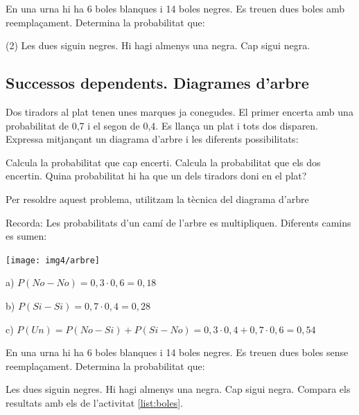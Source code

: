 \begin{mylist}
 \exer[1] \label{list:boles} En una urna hi ha 6 boles blanques i 14 boles negres. Es treuen dues boles amb reemplaçament. Determina la probabilitat que: 
\begin{tasks}(2)
	\task  Les dues siguin negres.  
	\task  Hi hagi almenys una negra.  
	\task  Cap sigui negra.
\end{tasks}

\subsection{Successos dependents. Diagrames d'arbre}

\begin{resolt}[E]{
	 Dos tiradors al plat tenen unes marques ja conegudes. El primer encerta amb una probabilitat de 0,7 i el segon de 0,4. Es llança un plat i tots dos disparen. Expressa mitjançant un diagrama d'arbre i les diferents possibilitats: 
	 \vspace{0.5cm}
	 
	 \begin{tasks}
	 	\task  Calcula la probabilitat que cap encerti.
	 	\task  Calcula la probabilitat que els dos encertin.
	 	\task  Quina probabilitat hi ha que un dels tiradors doni en el plat?
	 \end{tasks}
}
	Per resoldre aquest problema, utilitzam la tècnica del diagrama d'arbre 
	
	Recorda: Les probabilitats d'un camí de l'arbre es multipliquen. Diferents camins es sumen:
	
	\begin{center}
	\texttt{[image: img4/arbre]}
	\end{center}
	
	a) $P(No-No)=0,3 \cdot 0,6 = 0,18$
	
	b) $P(Si-Si)=0,7 \cdot 0,4 = 0,28$
	
	c) $P(Un)= P(No-Si)+P(Si-No) = 0,3 \cdot 0,4 + 0,7\cdot 0,6 = 0,54$
	
\end{resolt}
 
\exer[1]  En una urna hi ha 6 boles blanques i 14 boles negres. Es treuen dues boles sense reemplaçament. Determina la probabilitat que: 
\begin{tasks}
	\task  Les dues siguin negres. 
	\task  Hi hagi almenys una negra.
	\task  Cap sigui negra.
	\task  Compara els resultats amb els de l'activitat \ref{list:boles}.
\end{tasks}


\end{mylist}
